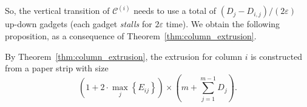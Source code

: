 So, the vertical transition of $\mathcal C^{(i)}$ needs to use a total of $\left( D_j - D_{i,j}\right)/\left( 2\varepsilon\right)$
up-down gadgets (each gadget \emph{stalls} for $2\varepsilon$ time).
We obtain the following proposition, as a consequence of Theorem~\ref{thm:column_extrusion}.

\begin{proposition}
\label{prop:accordion_layers}
By Theorem~\ref{thm:column_extrusion}, the extrusion for column $i$ is constructed from a paper strip with size
$$\left( 1 + 2\cdot\max_j\left\{ E_{ij}\right\}\right)\times \left( m + \sum\limits^{m-1}_{j=1} D_j \right). $$
\end{proposition}

